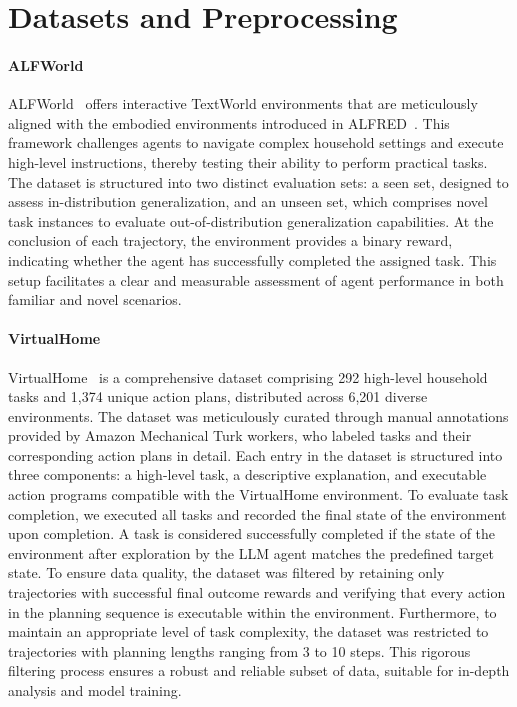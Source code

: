 \section{Datasets and Preprocessing}
\label{ref:ds}

\paragraph{ALFWorld}
ALFWorld~\citep{shridhar2020alfworld} offers interactive TextWorld environments that are meticulously aligned with the embodied environments introduced in ALFRED~\citep{shridhar2020alfred}. This framework challenges agents to navigate complex household settings and execute high-level instructions, thereby testing their ability to perform practical tasks. The dataset is structured into two distinct evaluation sets: a seen set, designed to assess in-distribution generalization, and an unseen set, which comprises novel task instances to evaluate out-of-distribution generalization capabilities. At the conclusion of each trajectory, the environment provides a binary reward, indicating whether the agent has successfully completed the assigned task. This setup facilitates a clear and measurable assessment of agent performance in both familiar and novel scenarios.

\paragraph{VirtualHome} 

VirtualHome~\citep{puig2018virtualhome} is a comprehensive dataset comprising 292 high-level household tasks and 1,374 unique action plans, distributed across 6,201 diverse environments. The dataset was meticulously curated through manual annotations provided by Amazon Mechanical Turk workers, who labeled tasks and their corresponding action plans in detail. Each entry in the dataset is structured into three components: a high-level task, a descriptive explanation, and executable action programs compatible with the VirtualHome environment. To evaluate task completion, we executed all tasks and recorded the final state of the environment upon completion. A task is considered successfully completed if the state of the environment after exploration by the LLM agent matches the predefined target state. To ensure data quality, the dataset was filtered by retaining only trajectories with successful final outcome rewards and verifying that every action in the planning sequence is executable within the environment. Furthermore, to maintain an appropriate level of task complexity, the dataset was restricted to trajectories with planning lengths ranging from 3 to 10 steps. This rigorous filtering process ensures a robust and reliable subset of data, suitable for in-depth analysis and model training.

